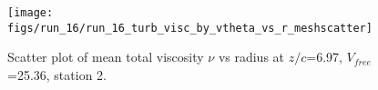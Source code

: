 \begin{figure}[H]
\centering
\texttt{[image: figs/run\_16/run\_16\_turb\_visc\_by\_vtheta\_vs\_r\_meshscatter]}
\caption{Scatter plot of mean total viscosity $\nu$ vs radius at $z/c$=6.97, $V_{free}$=25.36, station 2.}
\label{fig:run_16_turb_visc_by_vtheta_vs_r_meshscatter}
\end{figure}


